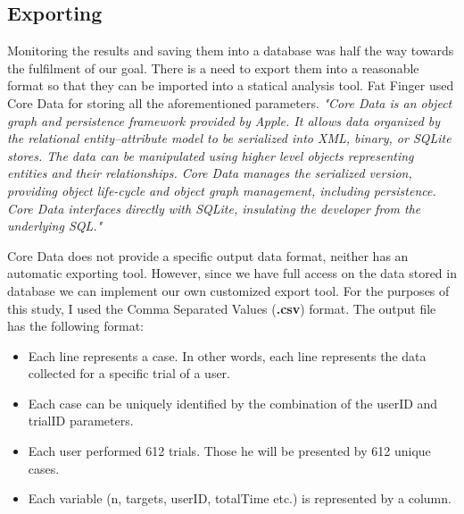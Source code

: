 \subsection{Exporting}
\label{sec:exporting}

Monitoring the results and saving them into a database was half the way towards the fulfilment of our goal. There is a need to export them into a reasonable format so that they can be imported into a statical analysis tool. Fat Finger used Core Data for storing all the aforementioned parameters.
\emph{"Core Data is an object graph and persistence framework provided by Apple. It allows data organized by the relational entity–attribute model to be serialized into XML, binary, or SQLite stores. The data can be manipulated using higher level objects representing entities and their relationships. Core Data manages the serialized version, providing object life-cycle and object graph management, including persistence. Core Data interfaces directly with SQLite, insulating the developer from the underlying SQL."} \cite{coreData}

Core Data does not provide a specific output data format, neither has an automatic exporting tool. However, since we have full access on the data stored in database we can implement our own customized export tool. For the purposes of this study, I used the Comma Separated Values (\textbf{.csv}) format. The output file has the following format:

\begin{itemize}
	\item Each line represents a case. In other words, each line represents the data collected for a specific trial of a user.
	\item Each case can be uniquely identified by the combination of the userID and trialID parameters.
	\item Each user performed 612 trials. Those he will be presented by 612 unique cases.
	\item Each variable (n, targets, userID, totalTime etc.) is represented by a column.
\end{itemize}







